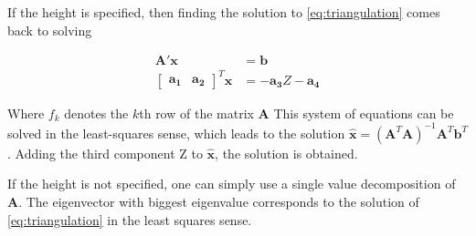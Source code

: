 If the height is specified, then finding the solution to \eqref{eq:triangulation} comes back to solving

\begin{align}
    \mathbf{A'}\mathbf{x}&=\mathbf{b}\\  
    \begin{bmatrix} \mathbf{a_1} & \mathbf{a_2} \end{bmatrix}^T \mathbf{x} &= -\mathbf{a_3}Z-\mathbf{a_4}
\end{align}

Where $f_k$ denotes the $k$th row of the matrix $\mathbf{A}$
This system of equations can be solved in the least-squares sense, which leads to the solution $\mathbf{\hat{x}}=(\mathbf{A}^T\mathbf{A})^{-1}\mathbf{A}^T\mathbf{b}^T$. Adding the third component Z to $\mathbf{\hat{x}}$, the solution is obtained.


If the height is not specified, one can simply use a single value decomposition of $\mathbf{A}$. The eigenvector with biggest eigenvalue corresponds to the solution of \eqref{eq:triangulation} in the least squares sense.


%	
%	
